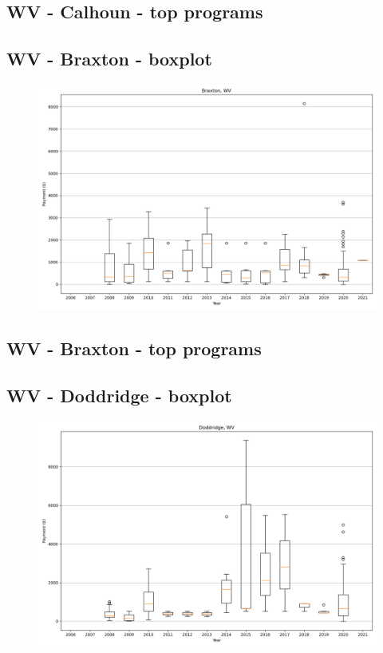 \subsection*{WV - Calhoun - top programs}

\newpage
\subsection*{WV - Braxton - boxplot}
\begin{figure}[h]
\centering
\includegraphics[width=7in]{../output/boxplots/counties/Braxton-WV_boxplot.png}
\end{figure}


\subsection*{WV - Braxton - top programs}

\newpage
\subsection*{WV - Doddridge - boxplot}
\begin{figure}[h]
\centering
\includegraphics[width=7in]{../output/boxplots/counties/Doddridge-WV_boxplot.png}
\end{figure}


